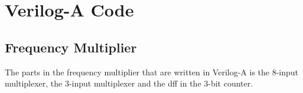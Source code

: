 \documentclass[a4paper,12pt]{article} \usepackage{graphicx}
\begin{document}
\newpage 
\appendix 
\newpage

\begin{thebibliography}{99}
%

\end{thebibliography}

\newpage

\section{Verilog-A Code}
\subsection{Frequency Multiplier}
The parts in the frequency multiplier that are written in Verilog-A is the 
8-input multiplexer, the 3-input multiplexer and the dff in the 3-bit counter.



\end{document}
